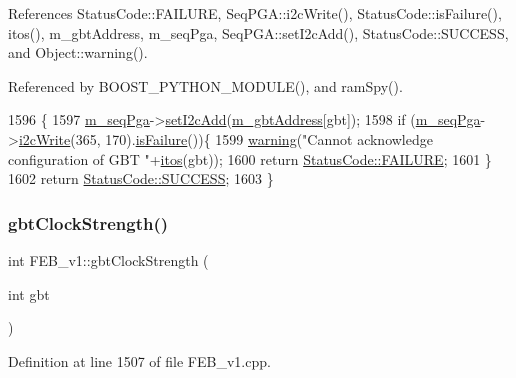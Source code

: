 References Status\+Code\+::\+F\+A\+I\+L\+U\+RE, Seq\+P\+G\+A\+::i2c\+Write(), Status\+Code\+::is\+Failure(), itos(), m\+\_\+gbt\+Address, m\+\_\+seq\+Pga, Seq\+P\+G\+A\+::set\+I2c\+Add(), Status\+Code\+::\+S\+U\+C\+C\+E\+SS, and Object\+::warning().



Referenced by B\+O\+O\+S\+T\+\_\+\+P\+Y\+T\+H\+O\+N\+\_\+\+M\+O\+D\+U\+L\+E(), and ram\+Spy().


\begin{DoxyCode}
1596                                               \{
1597   \hyperlink{classFEB__v1_a6c7804ac86796f233a8393043adf2e77}{m\_seqPga}->\hyperlink{classSeqPGA_a4ef334e4d2cb417b49033dce951728cd}{setI2cAdd}(\hyperlink{classFEB__v1_ac625855df976f16694178f1a4c0eef1e}{m\_gbtAddress}[gbt]);
1598   \textcolor{keywordflow}{if} (\hyperlink{classFEB__v1_a6c7804ac86796f233a8393043adf2e77}{m\_seqPga}->\hyperlink{classSeqPGA_a429076ca3a4ece94182bd95c623bb9d0}{i2cWrite}(365, 170).\hyperlink{classStatusCode_a5dd22dc6eb2c52fc4cabc58f6dea2eb7}{isFailure}())\{
1599     \hyperlink{classObject_a65cd4fda577711660821fd2cd5a3b4c9}{warning}(\textcolor{stringliteral}{"Cannot acknowledge configuration of GBT "}+\hyperlink{Tools_8h_af330027dbdafb9a30768b3613c553e60}{itos}(gbt));
1600     \textcolor{keywordflow}{return} \hyperlink{classStatusCode_a6f565cbeadc76d14c72f047e5e85eb4ba3da73d4c469762eb9d3c960368252b26}{StatusCode::FAILURE};
1601   \}
1602   \textcolor{keywordflow}{return} \hyperlink{classStatusCode_a6f565cbeadc76d14c72f047e5e85eb4badd0da38d3ba0d922efd1f4619bc37ad8}{StatusCode::SUCCESS};
1603 \}
\end{DoxyCode}
\mbox{\label{classFEB__v1_a6ca15de02d32e38a0fc90ad29302072e}} 
\subsubsection{\texorpdfstring{gbt\+Clock\+Strength()}{gbtClockStrength()}}
{\footnotesize\ttfamily int F\+E\+B\+\_\+v1\+::gbt\+Clock\+Strength (\begin{DoxyParamCaption}\item[{int}]{gbt }\end{DoxyParamCaption})}



Definition at line 1507 of file F\+E\+B\+\_\+v1.\+cpp.



